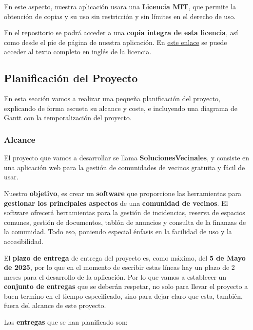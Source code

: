 En este aspecto, nuestra aplicación usara una \textbf{Licencia MIT}, que permite la obtención de copias y su uso sin restricción y sin límites en el derecho de uso. \cite{mit}

En el repositorio se podrá acceder a una \textbf{copia integra de esta licencia}, así como desde el píe de página de nuestra aplicación. En \href{https://opensource.org/license/mit}{este enlace} se puede acceder al texto completo en inglés de la licencia.


\subsection{Planificación del Proyecto}
En esta sección vamos a realizar una pequeña planificación del proyecto, explicando de forma escueta su alcance y coste, e incluyendo una diagrama de Gantt con la temporalización del proyecto.

\subsubsection{Alcance}
El proyecto que vamos a desarrollar se llama \textbf{SolucionesVecinales}, y consiste en una aplicación web para la gestión de comunidades de vecinos gratuita y fácil de usar.

Nuestro \textbf{objetivo}, es crear un \textbf{software} que proporcione las herramientas para \textbf{gestionar los principales aspectos} de una \textbf{comunidad de vecinos}. El software ofrecerá herramientas para la gestión de incidencias, reserva de espacios comunes, gestión de documentos, tablón de anuncios y consulta de la finanzas de la comunidad. Todo eso, poniendo especial énfasis en la facilidad de uso y la accesibilidad.

El \textbf{plazo de entrega} de entrega del proyecto es, como máximo, del \textbf{5 de Mayo de 2025}, por lo que en el momento de escribir estas líneas hay un plazo de 2 meses para el desarrollo de la aplicación. Por lo que vamos a establecer un \textbf{conjunto de entregas} que se deberán respetar, no solo para llevar el proyecto a buen termino en el tiempo especificado, sino para dejar claro que esta, también, fuera del alcance de este proyecto.

Las \textbf{entregas} que se han planificado son:

